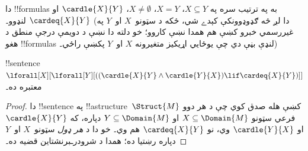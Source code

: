 \documentclass[../../../include/open-logic-section]{subfiles}
\begin{document}
دا !!{formula}s به په ترتيب سره په $X \subseteq Y$، $X = Y$،
$X \neq \emptyset$، $\cardle{X}{Y}$ او $\cardeq{X}{Y}$ لنډوو۔
(دا لږ څه ګډوډوونکې کېدے شي، ځکه د سټونو~$X$ او~$Y$ په
غيررسمي خبرو کښې هم همدا نښې کاروو؛ خو دلته دا نښې د دويمې درجې
منطق د هغو !!{formula}s لنډې بڼې دي چې يوځايي اړيکيز متغيرونه
$X$ او~$Y$ پکښې راځي۔)

\begin{prop}
!!{sentence} $\lforall[X][\lforall[Y][((\cardle{X}{Y} \land
    \cardle{Y}{X}) \lif \cardeq{X}{Y})]]$ معتبره ده۔
\end{prop}

\begin{proof}
دا !!{sentence} په !!a{structure}~$\Struct{M}$ کښې هله صدق کوي
چې د هر دوو فرعي سټونو $X \subseteq \Domain{M}$ او
$Y \subseteq \Domain{M}$ دپاره، که $\cardle{X}{Y}$ او
$\cardle{Y}{X}$ وي، نو $\cardeq{X}{Y}$ هم وي۔ خو دا د
\emph{هر ډول} سټونو~$X$ او~$Y$ دپاره رښتيا ده؛ همدا د
شرودرـبرنشتاين قضيه ده۔
\end{proof}
\end{document}
